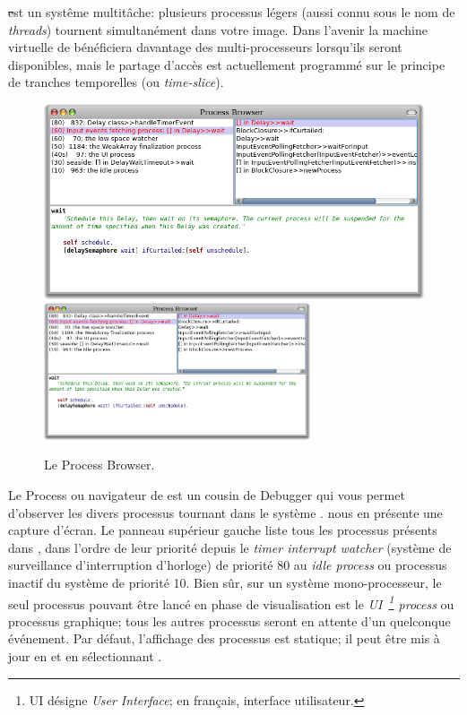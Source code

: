 \documentclass[a4paper,10pt,twoside]{book}
\begin{document}
\st est un systême multitâche: plusieurs processus légers (aussi
connu sous le nom de \emph{threads}) tournent simultanément dans
votre image.
Dans l'avenir la machine virtuelle de \pharo bénéficiera davantage
des multi-processeurs lorsqu'ils seront disponibles, mais le partage
d'accès est actuellement programmé sur le principe de 
tranches temporelles (ou \emph{time-slice}).

\begin{figure}[btp]
	\begin{center}
	\ifluluelse
		{\includegraphics[width=\textwidth]{processBrowser}}
		{\includegraphics[width=0.7\textwidth]{processBrowser}}
	\end{center}
	\caption{Le Process Browser.}
\end{figure}

Le Process  ou navigateur de  
est un cousin de Debugger qui vous permet d'observer les divers processus tournant
dans le système \pharo.
 nous en présente une capture d'écran.
Le panneau supérieur gauche liste tous les processus présents dans \pharo, 
dans l'ordre de leur priorité depuis le \emph{timer interrupt watcher} 
(système de surveillance d'interruption d'horloge) de priorité
80 au \emph{idle process} ou processus inactif du système de priorité 10.
Bien sûr, sur un système mono-processeur, le seul processus pouvant être 
lancé en phase de visualisation est le \emph{UI~\footnote{UI désigne 
\emph{User Interface}; en français, interface utilisateur.} process} 
ou processus graphique;
tous les autres processus seront en attente d'un quelconque événement.
Par défaut, l'affichage des processus est statique; il peut être
mis à jour en \actclickant{} et en sélectionnant . %
\end{document}
